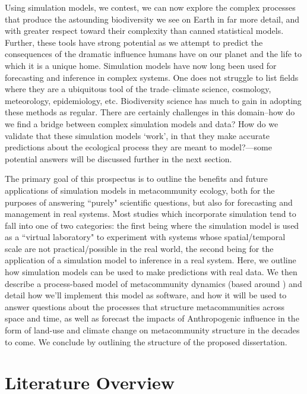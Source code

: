 \documentclass[]{article}
\begin{document}
Using simulation models, we contest, we can now explore the complex processes that produce the astounding biodiversity we see on Earth in far more detail, and with greater respect toward their complexity than canned statistical models.
Further, these tools have strong potential as we attempt to predict the consequences of the dramatic influence humans have on our planet and the life to which it is a unique home.
Simulation models have now long been used for forecasting and inference in complex systems.
One does not struggle to list fields where they are a ubiquitous tool of the trade--climate science, cosmology, meteorology, epidemiology, etc.
Biodiversity science has much to gain in adopting these methods as regular.
There are certainly challenges in this domain--how do we find a bridge between complex simulation models and data?
How do we validate that these simulation models `work', in that they make accurate predictions about the ecological process they are meant to model?---some potential answers will be discussed further in the next section.

The primary goal of this prospectus is to outline the benefits and future applications of simulation models in metacommunity ecology, both for the purposes of answering ``purely" scientific questions, but also for forecasting and management in real systems.
Most studies which incorporate simulation tend to fall into one of two categories: the first being where the simulation model is used as a ``virtual laboratory" \citep{railsback_agent-based_2011} to experiment with systems
whose spatial/temporal scale are not practical/possible in the real world, the second being for the application of a simulation model to inference in a real system.
Here, we outline how simulation models can be used to make predictions with real data. We then describe a
process-based model of metacommunity dynamics (based around \citep{vellend_conceptual_2010,poisot_beyond_2015,thompson_process-based_2020}) and detail how we'll implement this model as
software, and how it will be used to answer questions about the
processes that structure metacommunities across space and time, as well
as forecast the impacts of Anthropogenic influence in the form of land-use and
climate change on metacommunity structure in the decades to
come. We conclude by outlining the structure of the proposed dissertation.

\pagebreak


%
%
%
\hypertarget{literature-overview}{%
\section{Literature Overview}\label{literature-overview}}
\end{document}
